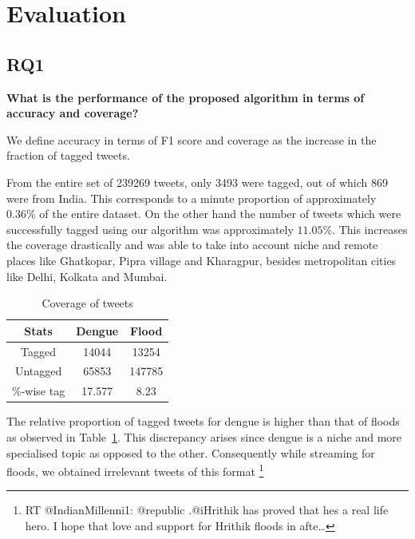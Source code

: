 \documentclass[journal, a4paper]{IEEEtran}
\begin{document}
\section{Evaluation}
\subsection{RQ1}
\textbf{What is the performance of the proposed algorithm in terms of accuracy and coverage?}

We define accuracy in terms of F1 score and coverage as the increase in the fraction of tagged tweets.

From the entire set of 239269 tweets, only 3493 were tagged, out of which 869 were from India. This corresponds to a minute proportion of approximately $0.36\%$ of the entire dataset. On the other hand the number of tweets which were successfully tagged using our algorithm was approximately $11.05\%$. This increases the coverage drastically and was able to take into account niche and remote places like Ghatkopar, Pipra village and Kharagpur, besides metropolitan cities like Delhi, Kolkata and Mumbai. 

	\begin{table}[!hbt]
		\begin{center}
			\caption{Coverage of tweets}
			\label{tab:Increase}
			\begin{tabular}{|c|c|c|}
				\hline
				Stats& Dengue& Flood\\\hline
				Tagged& 14044&13254\\
				Untagged& 65853 & 147785\\
				\%-wise tag& 17.577&8.23\\
				\hline
					
				\hline
			\end{tabular}
		\end{center}
	\end{table}
The relative proportion of tagged tweets for dengue is higher than that of floods as observed in Table~\ref{tab:Increase}. This discrepancy arises since dengue is a niche and more specialised topic as opposed to the other. 
Consequently while streaming for floods, we obtained irrelevant tweets of this format \footnote{RT @IndianMillenni1: @republic .@iHrithik has proved that hes a real life hero. I hope that love and support for Hrithik floods in afte…}
\end{document}
